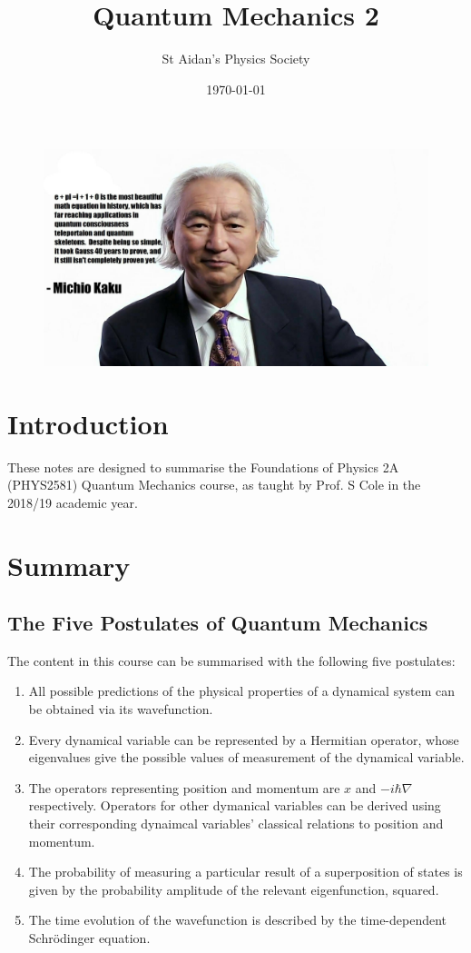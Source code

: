 \documentclass{../../physics_notes}
\title{Quantum Mechanics 2}
\author{St Aidan's Physics Society}
\date{\today}
\begin{document}
\maketitle
\begin{figure}[h!]
	\centering
	\includegraphics[width=\linewidth]{Figures/mich.png}
\end{figure}
\tableofcontents
\newpage

\section*{Introduction}

These notes are designed to summarise the Foundations of Physics 2A (PHYS2581) Quantum Mechanics course, as taught by Prof. S Cole in the 2018/19 academic year. 

\section*{Summary}

\subsection*{The Five Postulates of Quantum Mechanics}

The content in this course can be summarised with the following five postulates:

\begin{enumerate}
	\item All possible predictions of the physical properties of a dynamical system can be obtained via its wavefunction.
	\item Every dynamical variable can be represented by a Hermitian operator, whose eigenvalues give the possible values of measurement of the dynamical variable. 
	\item The operators representing position and momentum are $x$ and $-i\hbar\nabla$ respectively. Operators for other dymanical variables can be derived using their corresponding dynaimcal variables' classical relations to position and momentum. 
	\item The probability of measuring a particular result of a superposition of states is given by the probability amplitude of the relevant eigenfunction, squared. 
	\item The time evolution of the wavefunction is described by the time-dependent Schr\"odinger equation.
\end{enumerate}
\end{document}

